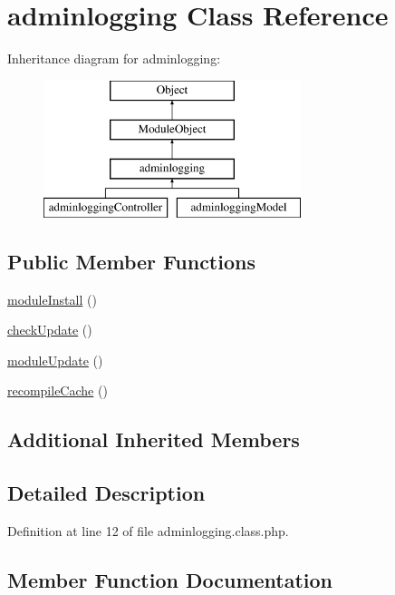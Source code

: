 \hypertarget{classadminlogging}{}\section{adminlogging Class Reference}
\label{classadminlogging}
Inheritance diagram for adminlogging\+:\begin{figure}[H]
\begin{center}
\leavevmode
\includegraphics[height=4.000000cm]{classadminlogging}
\end{center}
\end{figure}
\subsection*{Public Member Functions}
\begin{DoxyCompactItemize}
\item 
\hyperlink{classadminlogging_a177e26010673133e8a32bcb266416ff2}{module\+Install} ()
\item 
\hyperlink{classadminlogging_a982baf15267a89289d020bdfdd4ec3ec}{check\+Update} ()
\item 
\hyperlink{classadminlogging_ac07c04a3d4120d487311e4a89932c705}{module\+Update} ()
\item 
\hyperlink{classadminlogging_ad272a76b7aa666b084b7c0f6ab91b61c}{recompile\+Cache} ()
\end{DoxyCompactItemize}
\subsection*{Additional Inherited Members}


\subsection{Detailed Description}


Definition at line 12 of file adminlogging.\+class.\+php.



\subsection{Member Function Documentation}
\hypertarget{classadminlogging_a982baf15267a89289d020bdfdd4ec3ec}{}\label{classadminlogging_a982baf15267a89289d020bdfdd4ec3ec} 
